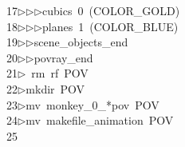 \begin{tabbing}
17\>$\triangleright$\>$\triangleright$\>$\triangleright$\>cubics\ 0\ (COLOR\_GOLD)\ \\[0pt]
18\>$\triangleright$\>$\triangleright$\>$\triangleright$\>planes\ 1\ (COLOR\_BLUE)\ \\[0pt]
19\>$\triangleright$\>$\triangleright$\>scene\_objects\_end\ \\[0pt]
20\>$\triangleright$\>$\triangleright$\>povray\_end\\[0pt]
21\>$\triangleright$\>\ rm\ rf\ POV\\[0pt]
22\>$\triangleright$\>mkdir\ POV\\[0pt]
23\>$\triangleright$\>mv\ monkey\_0\_*pov\ POV\\[0pt]
24\>$\triangleright$\>mv\ makefile\_animation\ POV\\[0pt]
25\>\end{tabbing}

